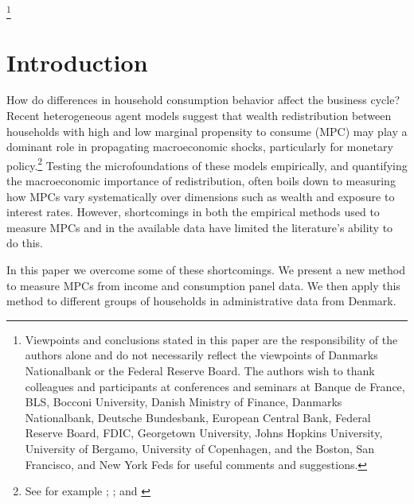 \documentclass[titlepage]{\econtex}\newcommand{\texname}{ConsumptionHeterogeneity}
\begin{document}
\begin{authorsinfo}
\end{authorsinfo}
\thanks{Viewpoints and conclusions stated in this paper are the responsibility of the authors alone and do not necessarily reflect the viewpoints of Danmarks Nationalbank or the Federal Reserve Board. The authors wish to thank colleagues and participants at conferences and seminars at Banque de France, BLS, Bocconi University, Danish Ministry of Finance, Danmarks Nationalbank, Deutsche Bundesbank, European Central Bank, Federal Reserve Board, FDIC, Georgetown University, Johns Hopkins University, University of Bergamo, University of Copenhagen, and the Boston, San Francisco, and New York Feds for useful comments and suggestions.}

\titlepagefinish
\setcounter{page}{1}

\pagebreak
\section{Introduction}
How do differences in household consumption behavior affect the business cycle? Recent heterogeneous agent models suggest that wealth redistribution between households with high and low marginal propensity to consume (MPC) may play a dominant role in propagating macroeconomic shocks, particularly for monetary policy.\footnote{See for example \cite{kaplan_monetary_2016}; \cite{garriga_mortgages_2017}; and \cite{greenwald_mortgage_2018}} Testing the microfoundations of these models empirically, and quantifying the macroeconomic importance of redistribution, often boils down to measuring how MPCs vary systematically over dimensions such as wealth and exposure to interest rates. However, shortcomings in both the empirical methods used to measure MPCs and in the available data have limited the literature's ability to do this.

In this paper we overcome some of these shortcomings. We present a new method to measure MPCs from income and consumption panel data. We then apply this method to different groups of households in administrative data from Denmark.
\end{document}
